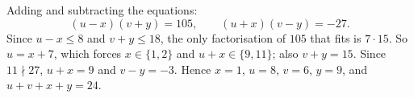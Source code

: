 Adding and subtracting the equations:
\[(u-x)(v+y)=105,\qquad(u+x)(v-y)=-27.\]
Since $u-x\le8$ and $v+y\le18$, the only factorisation of $105$ that fits is $7\cdot15$. So $u=x+7$, which forces $x\in\{1,2\}$ and $u+x\in\{9,11\}$; also $v+y=15$. Since $11\nmid27$, $u+x=9$ and $v-y=-3$. Hence $x=1$, $u=8$, $v=6$, $y=9$, and $u+v+x+y=\boxed{24}$.
